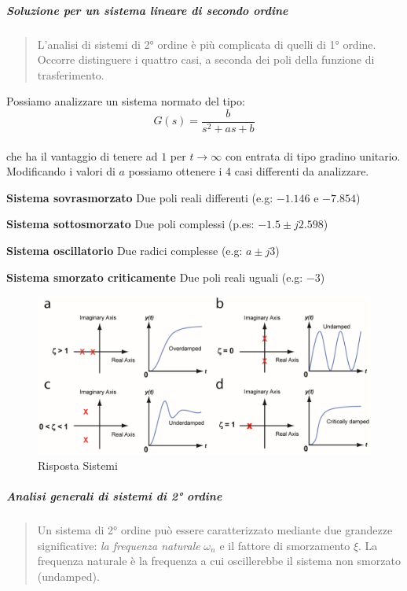 \documentclass[11pt]{article}
\makeatletter
\def\maxwidth{\ifdim\Gin@nat@width>\linewidth\linewidth
    \else\Gin@nat@width\fi}
\let\Oldincludegraphics\includegraphics
\renewcommand{\includegraphics}[1]{\Oldincludegraphics[width=.8\maxwidth]{#1}}
\makeatother
\begin{document}
    \hypertarget{soluzione-per-un-sistema-lineare-di-secondo-ordine}{%
\subparagraph{Soluzione per un sistema lineare di secondo
ordine}\label{soluzione-per-un-sistema-lineare-di-secondo-ordine}}

\begin{quote}
L'analisi di sistemi di 2° ordine è più complicata di quelli di 1°
ordine. Occorre distinguere i quattro casi, a seconda dei poli della
funzione di trasferimento.
\end{quote}

Possiamo analizzare un sistema normato del tipo: \begin{equation}
G(s) = \frac{b}{s^2 + as + b}
\end{equation}\\
che ha il vantaggio di tenere ad \(1\) per \(t \rightarrow \infty\) con
entrata di tipo gradino unitario. Modificando i valori di \(a\) possiamo
ottenere i 4 casi differenti da analizzare.

\textbf{Sistema sovrasmorzato} Due poli reali differenti (e.g:
\(-1.146\) e \(-7.854\))

\textbf{Sistema sottosmorzato} Due poli complessi (p.es:
\(-1.5 \pm j 2.598\))

\textbf{Sistema oscillatorio} Due radici complesse (e.g: \(a \pm j3\))

\textbf{Sistema smorzato criticamente} Due poli reali uguali (e.g:
\(-3\))

    \begin{figure}
\centering
\includegraphics{img/damping.png}
\caption{Risposta Sistemi}
\end{figure}

    \hypertarget{analisi-generali-di-sistemi-di-2-ordine}{%
\subparagraph{Analisi generali di sistemi di 2°
ordine}\label{analisi-generali-di-sistemi-di-2-ordine}}

\begin{quote}
Un sistema di 2° ordine può essere caratterizzato mediante due grandezze
significative: \emph{la frequenza naturale} \(\omega_n\) e il fattore di
smorzamento \(\xi\). La frequenza naturale è la frequenza a cui
oscillerebbe il sistema non smorzato (undamped).
\end{quote}
\end{document}
